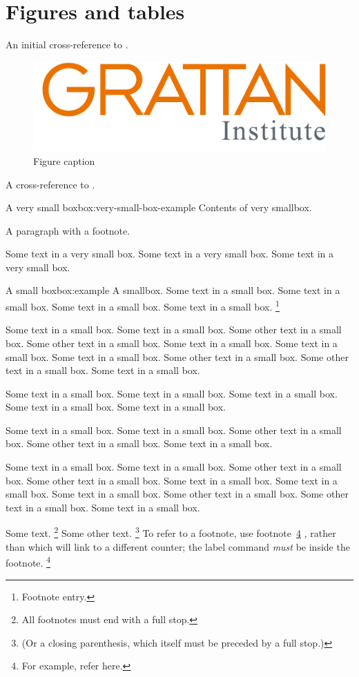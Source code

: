 \documentclass{grattan}
\begin{document}
\chapter{Figures and tables}\label{chap:figs-and-tbls}
An initial cross-reference to .

\begin{figure}
\caption{Figure caption\label{fig:first-example-figure}}
\includegraphics{logos/GrattanSVGLogo.pdf}
\end{figure}

A cross-reference to .

\begin{verysmallbox}{A very small box}{box:very-small-box-example}
Contents of very smallbox.

A paragraph with a footnote.

Some text in a very small box. 
Some text in a very small box. 
Some text in a very small box. 
\end{verysmallbox}

\begin{smallbox}{A small box}{box:example}
A smallbox. 
Some text in a small box. 
Some text in a small box. 
Some text in a small box. 
Some text in a small box.%
\footnote{Footnote entry.}


Some text in a small box. 
Some text in a small box. 
Some other text in a small box. 
Some other text in a small box. 
Some text in a small box. 
Some text in a small box. 
Some text in a small box. 
Some other text in a small box. 
Some other text in a small box. 
Some text in a small box. 


Some text in a small box. 
Some text in a small box. 
Some text in a small box. 
Some text in a small box. 
Some text in a small box.

Some text in a small box. 
Some text in a small box. 
Some other text in a small box. 
Some other text in a small box. 
Some text in a small box. 

Some text in a small box. 
Some text in a small box. 
Some other text in a small box. 
Some other text in a small box. 
Some text in a small box. 
Some text in a small box. 
Some text in a small box. 
Some other text in a small box. 
Some other text in a small box. 
Some text in a small box. 

Some text.%
\footnote{All footnotes must end with a full stop.} 
Some other text.%
\footnote{(Or a closing parenthesis, which itself must be preceded by a full stop.)}
To refer to a footnote, use footnote~\ref{fn:example} , rather than  which will link to a different counter; 
the label command \emph{must} be inside the footnote.%
\footnote{\label{fn:example}For example, refer here.}
\end{smallbox}
\end{document}
